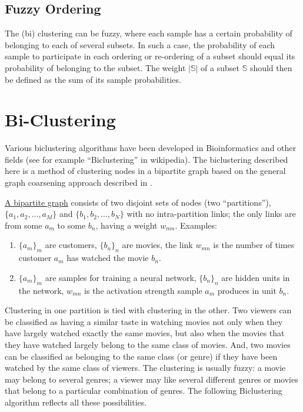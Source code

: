 \documentclass{article} %
\begin{document}
\subsection{Fuzzy Ordering}
The (bi) clustering can be fuzzy, where each sample has a certain probability of belonging to each of several subsets. In such a case, the probability of each sample to participate in each ordering or re-ordering of a subset should equal its probability of belonging to the subset. The weight $|\mathbb{S}|$ of a subset $\mathbb{S}$ should then be defined as the sum of its sample probabilities. 


\section{Bi-Clustering}
\label{sec:bi-clustering}
Various biclustering algorithms have been developed in Bioinformatics and other fields (see for example ``Biclustering'' in wikipedia). The biclustering described here is a method of clustering nodes in a bipartite graph based on the general graph coarsening approach described in \cite{RSB}. 

\underline{A bipartite graph} consists of two disjoint sets of nodes (two ``partitions''), $\{a_1,a_2,\ldots,a_M\}$ and 
$\{b_1,b_2,\ldots,b_N\}$ with no intra-partition links; the only links are from some $a_m$ to some $b_n$, having a weight $w_{mn}$. Examples:
\begin{enumerate}
\item
$\{a_m\}_m$ are customers, $\{b_n\}_n$ are movies, the link $w_{mn}$ is the number of times customer $a_m$ has watched the movie $b_n$.
\item 
$\{a_m\}_m$ are samples for training a neural network, $\{b_n\}_n$ are  hidden units in the network, $w_{mn}$ is the activation strength sample $a_m$ produces in unit $b_n$.
\end{enumerate}

Clustering in one partition is tied with clustering in the other. Two viewers can be classified as having a similar taste in watching movies not only when they have largely watched exactly the same movies, but also when the movies that they have watched largely belong to the same class of movies. And, two movies can be classified as belonging to the same class (or genre) if they have been watched by the same class of viewers. The clustering is usually fuzzy: a movie may belong to several genres; a viewer may like several different genres or movies that belong to a particular combination of genres. The following Biclustering algorithm reflects all these possibilities. 
\end{document}
